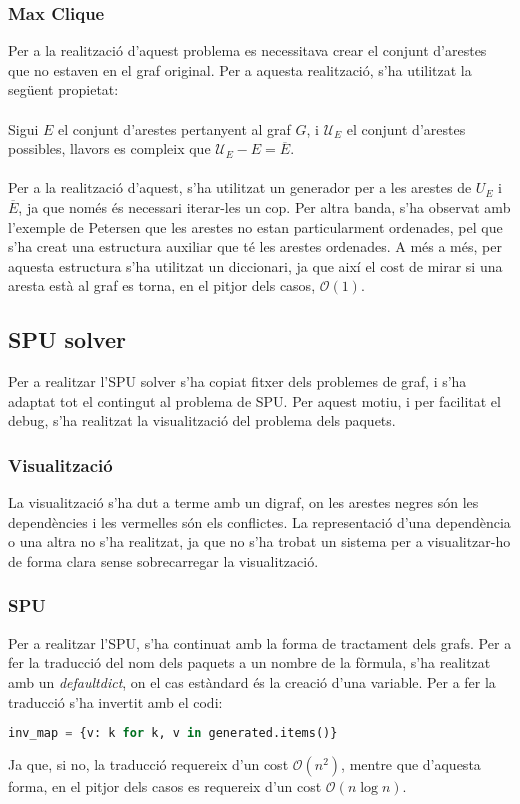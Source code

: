\documentclass{article}
\begin{document}
\subsubsection{Max Clique}
Per a la realització d'aquest problema es necessitava crear el conjunt d'arestes que no estaven
en el graf original. Per a aquesta realització, s'ha utilitzat la següent propietat:\\
\\
Sigui $E$ el conjunt d'arestes pertanyent al graf $G$, i $\mathcal{U}_E$ el conjunt d'arestes
possibles, llavors es compleix que $\mathcal{U}_E -E = \overline{E}$. \\
\\
Per a la realització d'aquest,
s'ha utilitzat un generador per a les arestes de $U_E$ i $\overline{E}$, ja que només és
necessari iterar-les un cop. Per altra banda, s'ha observat amb l'exemple de Petersen que les arestes
no estan particularment ordenades, pel que s'ha creat una estructura auxiliar que té les arestes ordenades.
A més a més, per aquesta estructura s'ha utilitzat un diccionari, ja que així el cost de mirar si una aresta està
al graf es torna, en el pitjor dels casos, $\mathcal{O}(1)$.

\subsection{SPU solver}
Per a realitzar l'SPU solver s'ha copiat fitxer dels problemes de graf, i 
s'ha adaptat tot el contingut al problema de SPU. Per aquest motiu, i 
per facilitat el debug, s'ha realitzat la visualització del problema dels paquets.
\subsubsection{Visualització}
La visualització s'ha dut a terme amb un digraf, on les arestes negres són les dependències i
les vermelles són els conflictes. La representació d'una dependència o una altra no
s'ha realitzat, ja que no s'ha trobat un sistema per a visualitzar-ho de forma clara 
sense sobrecarregar la visualització.
\subsubsection{SPU}
Per a realitzar l'SPU, s'ha continuat amb la forma de tractament dels grafs. Per a fer la traducció
del nom dels paquets a un nombre de la fòrmula, s'ha realitzat amb un \textit{defaultdict}, on el cas
estàndard és  la creació d'una variable. Per a fer la traducció s'ha invertit amb el codi:
\begin{lstlisting}[language=Python]
 inv_map = {v: k for k, v in generated.items()}                                                                                                                                                                                  
\end{lstlisting}
Ja que, si no, la traducció requereix d'un cost $\mathcal{O}(n^2)$, mentre que d'aquesta forma, en
el pitjor dels casos es requereix d'un cost $\mathcal{O}(n\log n)$.
\end{document}
